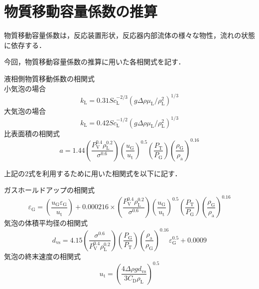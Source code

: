 \documentclass[a4j]{jsreport}
\begin{document}
\section{物質移動容量係数の推算}
物質移動容量係数は，反応装置形状，反応器内部流体の様々な物性，流れの状態に依存する．
\par
今回，物質移動容量係数の推算に用いた各相関式を記す．
\par
液相側物質移動係数の相関式\\
小気泡の場合
\begin{equation}
    k_\mathrm{L} = 0.31Sc_\mathrm{L}^{-2/3}(g \varDelta \rho \mu_\mathrm{L}/\rho_\mathrm{L}^2)^{1/3}
\end{equation}
大気泡の場合
\begin{equation}
    k_\mathrm{L} = 0.42Sc_\mathrm{L}^{-1/2}(g \varDelta \rho \mu_\mathrm{L}/\rho_\mathrm{L}^2)^{1/3}
\end{equation}
比表面積の相関式
\begin{equation}
    a = 1.44 \left( \frac{P_\mathrm{V}^{0.4} \rho_\mathrm{L}^{0.2} }{ \sigma^{0.6}} \right) \left( \frac{u_\mathrm{G}}{u_\mathrm{t}} \right)^{0.5} \left( \frac{P_\mathrm{T}}{P_\mathrm{G}} \right) \left( \frac{\rho_\mathrm{G}}{\rho_\mathrm{a}} \right)^{0.16}
\end{equation}

上記の2式を利用するために用いた相関式を以下に記す．

ガスホールドアップの相関式
\begin{equation}
    \varepsilon_{{\mathrm G}} = \left( \frac{u_{{\mathrm G}}\varepsilon_{{\mathrm G}}}{u_{{\mathrm t}}} \right) + 0.000216 \times \left( \frac{P_\mathrm{V}^{0.4} \rho_\mathrm{L}^{0.2} }{ \sigma^{0.6}} \right) \left( \frac{u_\mathrm{G}}{u_\mathrm{t}} \right)^{0.5} \left( \frac{P_\mathrm{T}}{P_\mathrm{G}} \right) \left( \frac{\rho_\mathrm{G}}{\rho_\mathrm{a}} \right)^{0.16}
\end{equation}
気泡の体積平均径の相関式
\begin{equation}
    d_\mathrm{vs} = 4.15 \left( \frac{\sigma^{0.6}}{P_\mathrm{V}^{0.4} \rho_\mathrm{L}^{0.2}} \right) \left( \frac{P_\mathrm{G}}{P_\mathrm{T}} \right) \left( \frac{\rho_\mathrm{a}}{\rho_\mathrm{G}} \right) ^{0.16} \varepsilon_\mathrm{G}^{0.5} + 0.0009
\end{equation}
気泡の終末速度の相関式
\begin{equation}
    u_\mathrm{t} = \left( \frac{4\varDelta \rho g d_\mathrm{vs}}{3C_\mathrm{D} \rho_\mathrm{L}} \right)^{0.5}
\end{equation}
\end{document}
